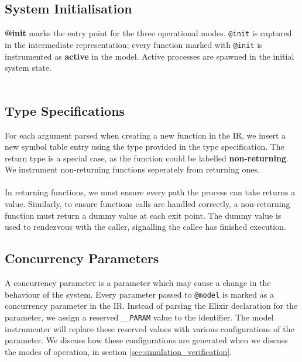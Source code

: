 \subsection{System Initialisation}
\textbf{@init} marks the entry point for the three operational modes. \texttt{@init} is captured in the intermediate representation; every function marked with \texttt{@init} is instrumented as \textbf{active} in the model. Active processes are spawned in the initial system state.
\\ \\
\subsection{Type Specifications}
For each argument parsed when creating a new function in the IR, we insert a new symbol table entry using the type provided in the type specification. The return type is a special case, as the function could be labelled \textbf{non-returning}. We instrument non-returning functions seperately from returning ones.
\\ \\
In returning functions, we must ensure every path the process can take returns a value. Similarly, to ensure functions calls are handled correctly, a non-returning function must return a dummy value at each exit point. The dummy value is used to rendezvous with the caller, signalling the callee has finished execution.
\subsection{Concurrency Parameters}
A concurrency parameter is a parameter which may cause a change in the behaviour of the system. Every parameter passed to \texttt{@model} is marked as a concurrency parameter in the IR. Instead of parsing the Elixir declaration for the parameter, we assign a reserved \texttt{\_\_PARAM} value to the identifier. The model instrumenter will replace these reserved values with various configurations of the parameter. We discuss how these configurations are generated when we discuss the modes of operation, in section \ref{sec:simulation_verification}.
\\ \\

